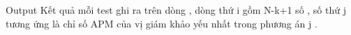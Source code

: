 Output
Kết quả mỗi test ghi ra trên dòng , dòng thứ i gồm N-k+1 số , số thứ j tương ứng là chỉ số APM của vị giám khảo yếu nhất trong phương án j .